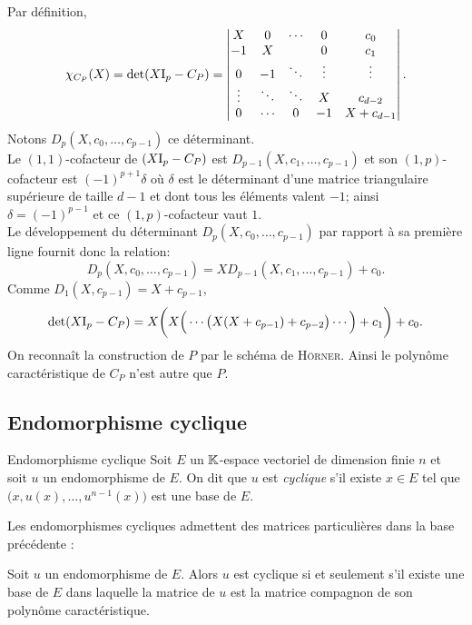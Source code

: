 \begin{preuve}
    Par définition,
    $$
    \chi_{C_P}(X) = \det(X \mathrm{I}_p - C_P) = 
    \begin{vmatrix}
        X & 0 & \cdots & 0 & c_0 \\
        -1 & X & & 0 & c_1 \\
        0 & -1 & \ddots & \vdots & \vdots \\
        \vdots & \ddots & \ddots & X & c_{d-2} \\
        0 & \cdots & 0 & -1 & X + c_{d-1}
    \end{vmatrix}.
    $$
    Notons $D_p(X, c_0, \dots, c_{p-1})$ ce déterminant. \\
    Le $(1,1)$-cofacteur de $(X \mathrm{I}_p - C_P)$ est $D_{p-1}(X, c_1, \dots, c_{p-1})$ et son $(1,p)$-cofacteur est $(-1)^{p+1} \delta$ où $\delta$ est le déterminant d'une matrice triangulaire supérieure de taille $d-1$ et dont tous les éléments valent $-1$; ainsi $\delta = (-1)^{p-1}$ et ce $(1,p)$-cofacteur vaut $1$. \\
    Le développement du déterminant $D_p(X, c_0, \dots, c_{p-1})$ par rapport à sa première ligne fournit donc la relation:
    $$D_p(X, c_0, \dots, c_{p-1}) = X D_{p-1}(X, c_1, \dots, c_{p-1}) + c_0.$$
    Comme $D_1(X, c_{p-1}) = X + c_{p-1}$,
    $$\det(X \mathrm{I}_p - C_P) = X \bigg(X \Big(\cdots \big(X(X+c_{p-1}) + c_{p-2} \big) \cdots \Big) + c_1 \bigg) + c_0.$$
    On reconnaît la construction de $P$ par le schéma de \textsc{Hörner}. Ainsi le polynôme caractéristique de $C_P$ n'est autre que $P$. 
\end{preuve} 

\subsection{Endomorphisme cyclique}

\begin{defi}{Endomorphisme cyclique}
    Soit $E$ un $\mathbb{K}$-espace vectoriel de dimension finie $n$ et soit $u$ un endomorphisme de $E$. On dit que $u$ est \emph{cyclique} s'il existe $x \in E$ tel que $\big(x, u(x), \dots, u^{n-1}(x) \big)$ est une base de $E$. 
\end{defi}

Les endomorphismes cycliques admettent des matrices particulières dans la base précédente :

\begin{prop}{} 
    Soit $u$ un endomorphisme de $E$. Alors $u$ est cyclique si et seulement s'il existe une base de $E$ dans laquelle la matrice de $u$ est la matrice compagnon de son polynôme caractéristique.
\end{prop}

